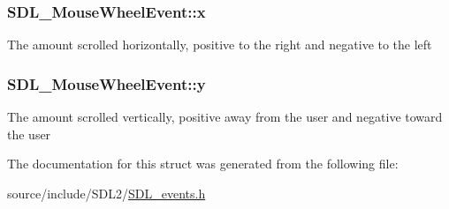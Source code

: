 \subsubsection[{x}]{ S\+D\+L\+\_\+\+Mouse\+Wheel\+Event\+::x}\label{struct_s_d_l___mouse_wheel_event_a6d904eef474ea45a5b1828fcb5b0f859}
The amount scrolled horizontally, positive to the right and negative to the left \hypertarget{struct_s_d_l___mouse_wheel_event_a53fdf77a464426bc8b30e629795f044b}{}
\subsubsection[{y}]{ S\+D\+L\+\_\+\+Mouse\+Wheel\+Event\+::y}\label{struct_s_d_l___mouse_wheel_event_a53fdf77a464426bc8b30e629795f044b}
The amount scrolled vertically, positive away from the user and negative toward the user 

The documentation for this struct was generated from the following file\+:\begin{DoxyCompactItemize}
\item 
source/include/\+S\+D\+L2/\hyperlink{_s_d_l__events_8h}{S\+D\+L\+\_\+events.\+h}\end{DoxyCompactItemize}
